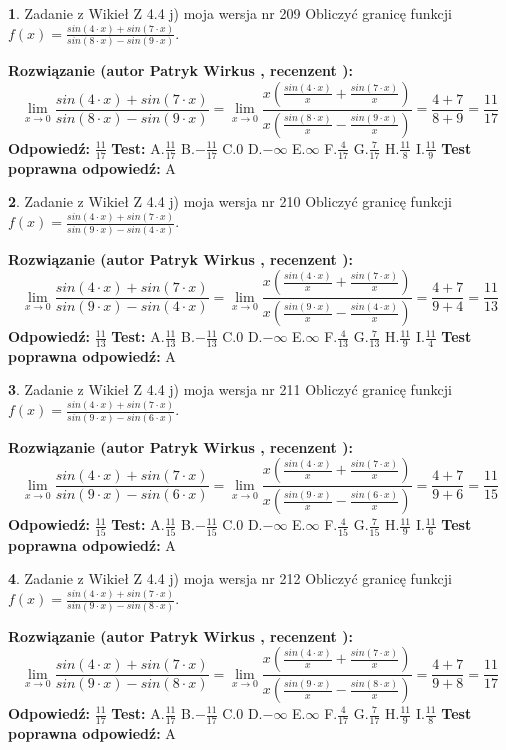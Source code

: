 \documentclass[12pt, a4paper]{article}
\theoremstyle{definition} %
\newtheorem{zad}{}
\newcommand{\zadStart}[1]{\begin{zad}#1\newline}
\newcommand{\zadStop}{\end{zad}}
\newcommand{\rozwStart}[2]{\noindent \textbf{Rozwiązanie (autor #1 , recenzent #2): }\newline}
\newcommand{\rozwStop}{\newline}
\newcommand{\odpStart}{\noindent \textbf{Odpowiedź:}\newline}
\newcommand{\odpStop}{\newline}
\newcommand{\testStart}{\noindent \textbf{Test:}\newline}
\newcommand{\testStop}{\newline}
\newcommand{\kluczStart}{\noindent \textbf{Test poprawna odpowiedź:}\newline}
\newcommand{\kluczStop}{\newline}
\begin{document}
\zadStart{Zadanie z Wikieł Z 4.4 j) moja wersja nr 209}
Obliczyć granicę funkcji $f(x)=\frac{sin(4\cdot x) +sin(7\cdot x)}{sin(8\cdot x) -sin(9\cdot x)}$.
\zadStop
\rozwStart{Patryk Wirkus}{}
$$\lim\limits_{x\to 0}\frac{sin(4\cdot x) +sin(7\cdot x)}{sin(8\cdot x) -sin(9\cdot x)}=\lim\limits_{x\to 0}\frac{x(\frac{sin(4\cdot x)}{x}+\frac{sin(7\cdot x)}{x})}{x(\frac{sin(8\cdot x)}{x}-\frac{sin(9\cdot x)}{x})}=\frac{4+7}{8+9} = \frac{11}{17}$$
\rozwStop
\odpStart
$\frac{11}{17}$
\odpStop
\testStart
A.$\frac{11}{17}$
B.$-\frac{11}{17}$
C.$0$
D.$-\infty$
E.$\infty$
F.$\frac{4}{17}$
G.$\frac{7}{17}$
H.$\frac{11}{8}$
I.$\frac{11}{9}$
\testStop
\kluczStart
A
\kluczStop



\zadStart{Zadanie z Wikieł Z 4.4 j) moja wersja nr 210}
Obliczyć granicę funkcji $f(x)=\frac{sin(4\cdot x) +sin(7\cdot x)}{sin(9\cdot x) -sin(4\cdot x)}$.
\zadStop
\rozwStart{Patryk Wirkus}{}
$$\lim\limits_{x\to 0}\frac{sin(4\cdot x) +sin(7\cdot x)}{sin(9\cdot x) -sin(4\cdot x)}=\lim\limits_{x\to 0}\frac{x(\frac{sin(4\cdot x)}{x}+\frac{sin(7\cdot x)}{x})}{x(\frac{sin(9\cdot x)}{x}-\frac{sin(4\cdot x)}{x})}=\frac{4+7}{9+4} = \frac{11}{13}$$
\rozwStop
\odpStart
$\frac{11}{13}$
\odpStop
\testStart
A.$\frac{11}{13}$
B.$-\frac{11}{13}$
C.$0$
D.$-\infty$
E.$\infty$
F.$\frac{4}{13}$
G.$\frac{7}{13}$
H.$\frac{11}{9}$
I.$\frac{11}{4}$
\testStop
\kluczStart
A
\kluczStop



\zadStart{Zadanie z Wikieł Z 4.4 j) moja wersja nr 211}
Obliczyć granicę funkcji $f(x)=\frac{sin(4\cdot x) +sin(7\cdot x)}{sin(9\cdot x) -sin(6\cdot x)}$.
\zadStop
\rozwStart{Patryk Wirkus}{}
$$\lim\limits_{x\to 0}\frac{sin(4\cdot x) +sin(7\cdot x)}{sin(9\cdot x) -sin(6\cdot x)}=\lim\limits_{x\to 0}\frac{x(\frac{sin(4\cdot x)}{x}+\frac{sin(7\cdot x)}{x})}{x(\frac{sin(9\cdot x)}{x}-\frac{sin(6\cdot x)}{x})}=\frac{4+7}{9+6} = \frac{11}{15}$$
\rozwStop
\odpStart
$\frac{11}{15}$
\odpStop
\testStart
A.$\frac{11}{15}$
B.$-\frac{11}{15}$
C.$0$
D.$-\infty$
E.$\infty$
F.$\frac{4}{15}$
G.$\frac{7}{15}$
H.$\frac{11}{9}$
I.$\frac{11}{6}$
\testStop
\kluczStart
A
\kluczStop



\zadStart{Zadanie z Wikieł Z 4.4 j) moja wersja nr 212}
Obliczyć granicę funkcji $f(x)=\frac{sin(4\cdot x) +sin(7\cdot x)}{sin(9\cdot x) -sin(8\cdot x)}$.
\zadStop
\rozwStart{Patryk Wirkus}{}
$$\lim\limits_{x\to 0}\frac{sin(4\cdot x) +sin(7\cdot x)}{sin(9\cdot x) -sin(8\cdot x)}=\lim\limits_{x\to 0}\frac{x(\frac{sin(4\cdot x)}{x}+\frac{sin(7\cdot x)}{x})}{x(\frac{sin(9\cdot x)}{x}-\frac{sin(8\cdot x)}{x})}=\frac{4+7}{9+8} = \frac{11}{17}$$
\rozwStop
\odpStart
$\frac{11}{17}$
\odpStop
\testStart
A.$\frac{11}{17}$
B.$-\frac{11}{17}$
C.$0$
D.$-\infty$
E.$\infty$
F.$\frac{4}{17}$
G.$\frac{7}{17}$
H.$\frac{11}{9}$
I.$\frac{11}{8}$
\testStop
\kluczStart
A
\kluczStop
\end{document}
